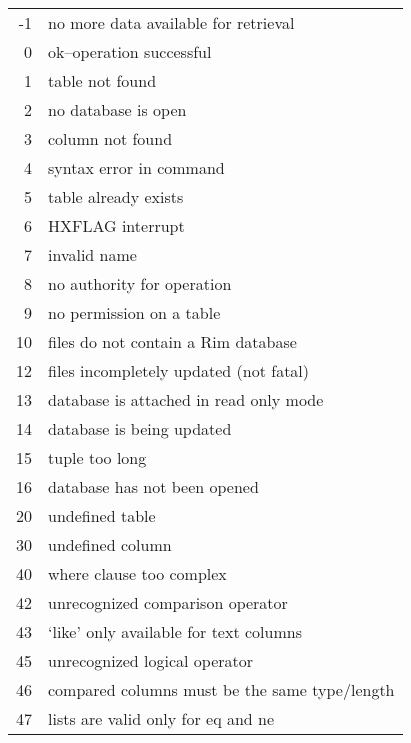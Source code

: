 \documentclass[11pt,a4paper]{report}
\begin{document}
\begin{figure}[p]
\centering
\begin{tabular}{rl}
 -1& no more data available for retrieval                  \\
  0& ok--operation successful                              \\
  1& table not found                                       \\
  2& no database is open                                   \\
  3& column not found                                      \\
  4& syntax error in command                               \\
  5& table already exists                                  \\
  6& HXFLAG interrupt                                      \\
  7& invalid name                                          \\
  8& no authority for operation                            \\
  9& no permission on a table                              \\
 10& files do not contain a Rim database        \\
 12& files incompletely updated (not fatal)       \\
 13& database is attached in read only mode                \\
 14& database is being updated                             \\
 15& tuple too long                                        \\
 16& database has not been opened                          \\
 20& undefined table                                    \\
 30& undefined column                                   \\
 40& where clause too complex                           \\
 42& unrecognized comparison operator                      \\
 43& `like' only available for text columns           \\
 45& unrecognized logical operator                          \\
 46& compared columns must be the same type/length      \\
 47& lists are valid only for eq and ne                    \\

\end{tabular}
\end{figure}
\end{document}
